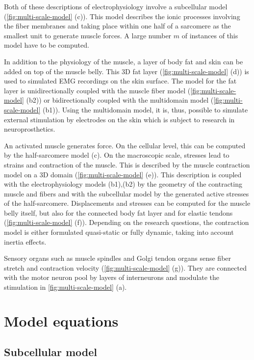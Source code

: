 Both of these descriptions of electrophysiology involve a subcellular model (\cref{fig:multi-scale-model} (c)). This model describes the ionic processes involving the fiber membranes and taking place within one half of a sarcomere as the smallest unit to generate muscle forces. A large number $m$ of instances of this model have to be computed. 

In addition to the physiology of the muscle, a layer of body fat and skin can be added on top of the muscle belly. This 3D fat layer (\cref{fig:multi-scale-model} (d)) is used to simulated EMG recordings on the skin surface. The model for the fat layer is unidirectionally coupled with the muscle fiber model (\cref{fig:multi-scale-model} (b2)) or bidirectionally coupled with the multidomain model (\cref{fig:multi-scale-model} (b1)). Using the multidomain model, it is, thus, possible to simulate external stimulation by electrodes on the skin which is subject to research in neuroprosthetics.

An activated muscle generates force. On the cellular level, this can be computed by the half-sarcomere model (c). On the macroscopic scale, stresses lead to strains and contraction of the muscle. This is described by the muscle contraction model on a 3D domain (\cref{fig:multi-scale-model} (e)). This description is coupled with the electrophysiology models (b1),(b2) by the geometry of the contracting muscle and fibers and with the subcellular model by the generated active stresses of the half-sarcomere. Displacements and stresses can be computed for the muscle belly itself, but also for the connected body fat layer and for elastic tendons (\cref{fig:multi-scale-model} (f)). Depending on the research questions, the contraction model is either formulated quasi-static or fully dynamic, taking into account inertia effects.

Sensory organs such as muscle spindles and Golgi tendon organs sense fiber stretch and contraction velocity (\cref{fig:multi-scale-model} (g)). They are connected with the motor neuron pool by layers of interneurons and modulate the stimulation in \cref{fig:multi-scale-model} (a).


\section{Model equations}
\subsection{Subcellular model}

